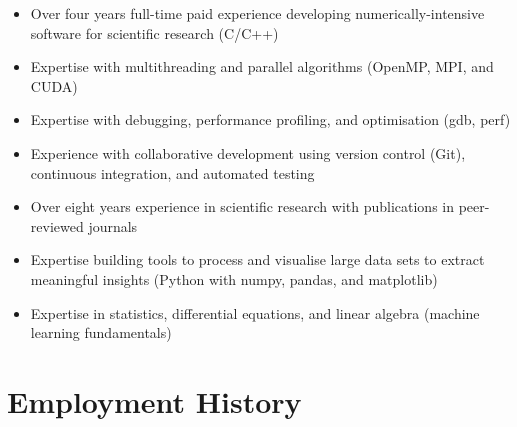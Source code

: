 \documentclass[11pt]{article} %
\begin{document}



\begin{itemize}
  \item Over four years full-time paid experience developing numerically-intensive software for scientific research (C/C++)
  \item Expertise with multithreading and parallel algorithms (OpenMP, MPI, and CUDA)
  \item Expertise with debugging, performance profiling, and optimisation (gdb, perf)
  \item Experience with collaborative development using version control (Git), continuous integration, and automated testing
  \item Over eight years experience in scientific research with publications in peer-reviewed  journals
  \item Expertise building tools to process and visualise large data sets to extract meaningful insights (Python with numpy, pandas, and matplotlib)
  \item Expertise in statistics, differential equations, and linear algebra (machine learning fundamentals)
\end{itemize}



\section{Employment History}
\end{document}
